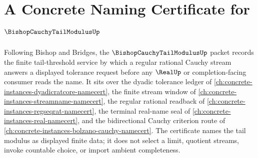 \chapter{A Concrete Naming Certificate for $\BishopCauchyTailModulusUp$}
\label{ch:concrete-instances-bishop-cauchy-tail-modulus-namecert}

Following Bishop and Bridges, the $\BishopCauchyTailModulusUp$ packet records the finite tail-threshold service by which a regular rational Cauchy stream answers a displayed tolerance request before any $\RealUp$ or completion-facing consumer reads the name. It sits over the dyadic tolerance ledger of \autoref{ch:concrete-instances-dyadicratcore-namecert}, the finite stream window of \autoref{ch:concrete-instances-streamname-namecert}, the regular rational readback of \autoref{ch:concrete-instances-regseqrat-namecert}, the terminal real-name seal of \autoref{ch:concrete-instances-real-namecert}, and the bidirectional Cauchy criterion route of \autoref{ch:concrete-instances-bolzano-cauchy-namecert}. The certificate names the tail modulus as displayed finite data; it does not select a limit, quotient streams, invoke countable choice, or import ambient completeness.



